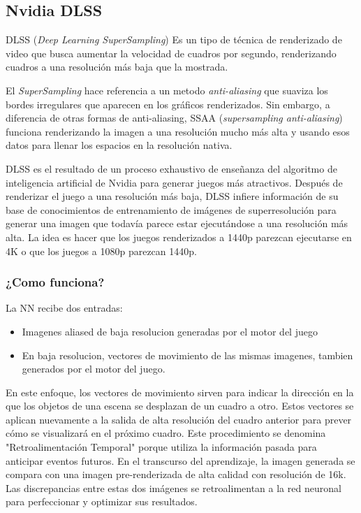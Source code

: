 \documentclass[runningheads]{llncs} %
\begin{document}
\subsection{Nvidia DLSS}
DLSS (\textit{Deep Learning SuperSampling}) Es un tipo de técnica de 
renderizado de video que busca aumentar la velocidad de cuadros por
segundo, renderizando cuadros a una resolución más baja que la mostrada.

El \textit{SuperSampling} hace
referencia a un metodo \textit{anti-aliasing} que suaviza los bordes 
irregulares que aparecen en los gráficos renderizados. 
Sin embargo, a diferencia de otras formas de anti-aliasing, 
SSAA (\textit{supersampling anti-aliasing}) funciona renderizando la imagen 
a una resolución mucho más alta y usando esos datos para llenar 
los espacios en la resolución nativa. \cite{ej-dlss}



DLSS es el resultado de un proceso exhaustivo de enseñanza del algoritmo
de inteligencia artificial de Nvidia para generar juegos más atractivos.
Después de renderizar el juego a una resolución más baja, 
DLSS infiere información de su base de conocimientos de entrenamiento 
de imágenes de superresolución para generar una imagen que todavía 
parece estar ejecutándose a una resolución más alta. 
La idea es hacer que los juegos renderizados a 1440p parezcan 
ejecutarse en 4K o que los juegos a 1080p parezcan 1440p. \cite{ej-dlss}

\subsubsection{¿Como funciona?}
La NN recibe dos entradas: 
\begin{itemize}
    \item{Imagenes aliased de baja resolucion generadas por el motor del
    juego}
    \item{En baja resolucion, vectores de movimiento de las mismas imagenes,
    tambien generados por el motor del juego.}
\end{itemize}

En este enfoque, los vectores de movimiento sirven para indicar la dirección 
en la que los objetos de una escena se desplazan de un cuadro a otro. 
Estos vectores se aplican nuevamente a la salida de alta resolución 
del cuadro anterior para prever cómo se visualizará en el próximo cuadro. 
Este procedimiento se denomina "Retroalimentación Temporal" porque utiliza 
la información pasada para anticipar eventos futuros. 
En el transcurso del aprendizaje, la imagen generada se compara con una 
imagen pre-renderizada de alta calidad con resolución de 16k.
Las discrepancias entre estas dos imágenes se retroalimentan a la red neuronal 
para perfeccionar y optimizar sus resultados. \cite{ej-dlss2}
\end{document}
